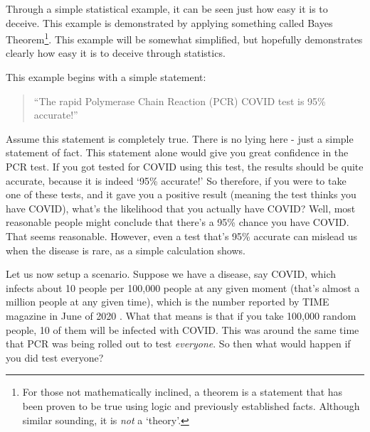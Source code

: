 \documentclass[10pt]{article}
\begin{document}
\begin{multicols}{2}
Through a simple statistical example, it can be seen just how easy it is to deceive. This example is demonstrated by applying something called Bayes Theorem\footnote{For those not mathematically inclined, a theorem is a statement that has been proven to be true using logic and previously established facts. Although similar sounding, it is \textit{not} a `theory'.}. This example will be somewhat simplified, but hopefully demonstrates clearly how easy it is to deceive through statistics. 

This example begins with a simple statement:
\begin{quotation}
``The rapid Polymerase Chain Reaction (PCR) COVID test is 95\% accurate!''
\end{quotation}
Assume this statement is completely true. There is no lying here - just a simple statement of fact. This statement alone would give you great confidence in the PCR test. If you got tested for COVID using this test, the results should be quite accurate, because it is indeed `95\% accurate!' So therefore, if you were to take one of these tests, and it gave you a positive result (meaning the test thinks you have COVID), what's the likelihood that you actually have COVID? Well, most reasonable people might conclude that there's a 95\% chance you have COVID. That seems reasonable. However, even a test that's 95\% accurate can mislead us when the disease is rare, as a simple calculation shows.

Let us now setup a scenario. Suppose we have a disease, say COVID, which infects about 10 people per 100,000 people at any given moment (that's almost a million people at any given time), which is the number reported by TIME magazine in June of 2020 \cite{TIME}. What that means is that if you take 100,000 random people, 10 of them will be infected with COVID. This was around the same time that PCR was being rolled out to test \textit{everyone}. So then what would happen if you did test everyone?


\end{multicols}
\end{document}
